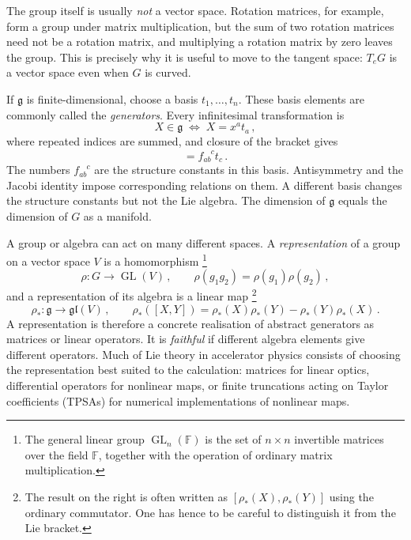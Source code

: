 The group itself is usually \emph{not} a vector space.  Rotation matrices,
for example, form a group under matrix multiplication, but the sum of two
rotation matrices need not be a rotation matrix, and multiplying a rotation
matrix by zero leaves the group.  This is precisely why it is useful to move
to the tangent space: $T_eG$ is a vector space even when $G$ is curved.

If $\mathfrak{g}$ is finite-dimensional, choose a basis
$t_1,\ldots,t_n$.  These basis elements are commonly called the
\emph{generators}.  Every infinitesimal transformation is
\begin{equation}
    X \in \mathfrak{g} \;\Leftrightarrow\; X = x^at_a\,,
\end{equation}
where repeated indices are summed, and closure of the bracket gives
\begin{equation}
    [t_a,t_b] = f_{ab}^{\phantom{ab}c}t_c\,.
\end{equation}
The numbers $f_{ab}^{\phantom{ab}c}$ are the structure constants in this
basis.  Antisymmetry and the Jacobi identity impose corresponding relations
on them.  A different basis changes the structure constants but not the Lie
algebra.  The dimension of $\mathfrak{g}$ equals the dimension of $G$ as a
manifold.

A group or algebra can act on many different spaces.  A
\emph{representation} of a group on a vector space $V$ is a homomorphism
\footnote{
    The general linear group $\operatorname{GL}_n(\mathbb{F})$ is the set of
    $n\times n$ invertible matrices over the field $\mathbb{F}$, together
    with the operation of ordinary matrix multiplication.
}
\begin{equation}
    \rho:G\longrightarrow \operatorname{GL}(V)\,,
    \qquad \rho(g_1g_2) = \rho(g_1)\rho(g_2)\,,
\end{equation}
and a representation of its algebra is a linear map
\footnote{The result on the right is often written as $[\rho_*(X),\rho_*(Y)]$
using the ordinary commutator. One has hence to be careful to distinguish
it from the Lie bracket.}
\begin{equation}
    \rho_*:\mathfrak{g}\longrightarrow\mathfrak{gl}(V)\,,
    \qquad
    \rho_*([X,Y]) = \rho_*(X)\rho_*(Y) - \rho_*(Y)\rho_*(X)\,.
\end{equation}
A representation is
therefore a concrete realisation of abstract generators as matrices or
linear operators.  It is \emph{faithful} if different algebra elements give
different operators.  Much of Lie theory in accelerator physics consists of
choosing the representation best suited to the calculation: matrices for
linear optics, differential operators for nonlinear maps, or finite
truncations acting on Taylor coefficients (TPSAs) for numerical
implementations of nonlinear maps.


